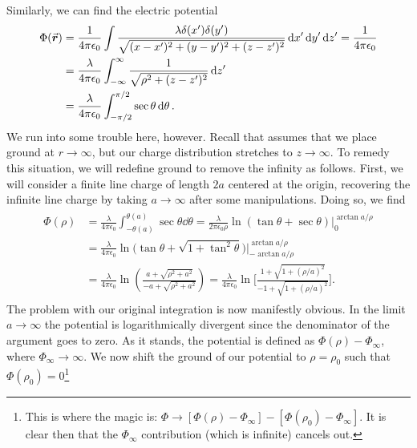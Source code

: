 {Similarly, we can find the electric potential
\begin{eqnarray}
    \begin{aligned}
        \Phi(\va*{r}) &= \frac{1}{4 \pi \epsilon_0} \int \frac{\lambda \delta(x') \delta(y')}{\sqrt{(x - x')^2 + (y - y')^2 + (z - z')^2}} \dd{x'} \dd{y'} \dd{z'} = \frac{1}{4 \pi \epsilon_0} \\
                      &= \frac{\lambda}{4 \pi \epsilon_0} \int_{-\infty}^{\infty} \frac{1}{\sqrt{\rho^2 + (z - z')^2}} \dd{z'} \\
                      &= \frac{\lambda}{4 \pi \epsilon_0} \int_{-\pi/2}^{\pi/2} \sec{\theta} \dd{\theta}
    .\end{aligned}
\end{eqnarray}
We run into some trouble here, however.
Recall that  assumes that we place ground at $r \rightarrow \infty$, but our charge distribution stretches to $z \rightarrow \infty$.
To remedy this situation, we will redefine ground to remove the infinity as follows.
First, we will consider a finite line charge of length $2a$ centered at the origin, recovering the infinite line charge by taking $a \rightarrow \infty$ after some manipulations.
Doing so, we find
\begin{eqnarray}
    \begin{aligned}
        \Phi(\rho) &= \frac{\lambda}{4 \pi \epsilon_0} \int_{-\theta(a)}^{\theta(a)} \sec{\theta} \dd{\theta} = \frac{\lambda}{2 \pi \epsilon_0 \rho} \ln{(\tan{\theta} + \sec{\theta})} \Big|_{0}^{\arctan{a/\rho}} \\
        &= \frac{\lambda}{4 \pi \epsilon_0} \ln{\Big( \tan{\theta} + \sqrt{1 + \tan^2{\theta}} \Big)} \Big|_{-\arctan{a/\rho}}^{\arctan{a/\rho}} \\
        &= \frac{\lambda}{4 \pi \epsilon_0} \ln( \frac{a + \sqrt{ \rho^2 + a^2 }}{-a + \sqrt{\rho^2 + a^2}} ) = \frac{\lambda}{4 \pi \epsilon_0} \ln\Bigg[ \frac{1 + \sqrt{1 + ( \rho/a )^2}}{-1 + \sqrt{1 + ( \rho/a )^2}} \Bigg]
    .\end{aligned}
\end{eqnarray}
The problem with our original integration is now manifestly obvious.
In the limit $a \rightarrow \infty$ the potential is logarithmically divergent since the denominator of the argument goes to zero.
As it stands, the potential is defined as $\Phi(\rho) - \Phi_{\infty}$, where $\Phi_{\infty} \rightarrow \infty$.
We now shift the ground of our potential to $\rho = \rho_0$ such that $\Phi(\rho_0) = 0$\footnote{This is where the magic is: $\Phi \rightarrow [ \Phi(\rho) - \Phi_{\infty}] - [\Phi(\rho_{0}) - \Phi_{\infty}]$. It is clear then that the $\Phi_{\infty}$ contribution (which is infinite) cancels out.}
}
